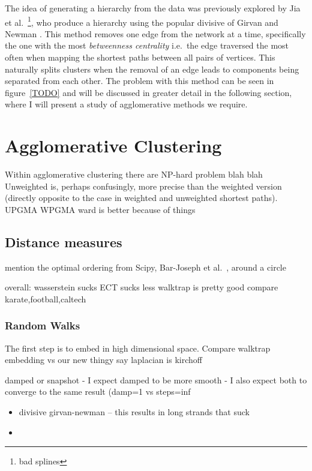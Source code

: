 The idea of generating a hierarchy from the data was previously explored by Jia et al.~\cite{TODO}\footnote{bad splines}, who produce a hierarchy using the popular divisive of Girvan and Newman \cite{TODO}. This method removes one edge from the network at a time, specifically the one with the most \emph{betweenness centrality} i.e.\ the edge traversed the most often when mapping the shortest paths between all pairs of vertices. This naturally splits clusters when the removal of an edge leads to components being separated from each other.
The problem with this method can be seen in figure~\ref{TODO} and will be discussed in greater detail in the following section, where I will present a study of agglomerative methods we require. 


\section{Agglomerative Clustering}
Within agglomerative clustering there are 
NP-hard problem blah blah
Unweighted is, perhaps confusingly, more precise than the weighted version (directly opposite to the case in weighted and unweighted shortest paths). 
UPGMA WPGMA ward is better because of things


\subsection{Distance measures}

mention the optimal ordering from Scipy, Bar-Joseph et al.~\cite{TODO}, around a circle

overall:
wasserstein sucks
ECT sucks less
walktrap is pretty good
compare karate,football,caltech

\subsubsection{Random Walks}
The first step is to embed in high dimensional space.
Compare walktrap embedding vs our new thingy
say laplacian is kirchoff

damped or snapshot
 - I expect damped to be more smooth
 - I also expect both to converge to the same result (damp=1 vs steps=inf

\begin{itemize}
    \item divisive girvan-newman -- this results in long strands that suck
    \item
\end{itemize}

